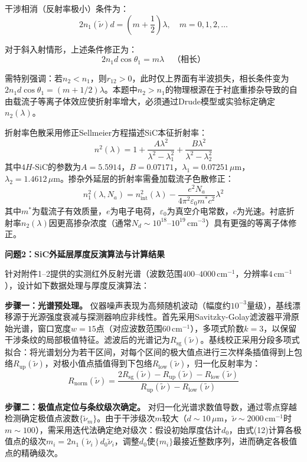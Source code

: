 \documentclass{mcmthesis}
\begin{document}
干涉相消（反射率极小）条件为：
$$2n_1(\tilde{\nu})d = \left(m+\frac{1}{2}\right)\lambda, \quad m=0,1,2,\ldots \tag{13}$$

对于斜入射情形，上述条件修正为：
$$2n_1 d\cos\theta_1 = m\lambda \quad \text{（相长）} \tag{14}$$

需特别强调：若$n_2 < n_1$，则$r_{12} > 0$，此时仅上界面有半波损失，相长条件变为$2n_1d\cos\theta_1 = (m+1/2)\lambda$。本题中$n_2 > n_1$的物理根源在于衬底重掺杂导致的自由载流子等离子体效应使折射率增大，必须通过Drude模型或实验标定确定$n_2(\lambda)$。

折射率色散采用修正Sellmeier方程描述SiC本征折射率：
$$n^2(\lambda) = 1 + \frac{A\lambda^2}{\lambda^2-\lambda_1^2} + \frac{B\lambda^2}{\lambda^2-\lambda_2^2} \tag{15}$$
其中$4H$-SiC的参数为$A=5.5914$，$B=0.07171$，$\lambda_1=0.07251\,\mu\mathrm{m}$，$\lambda_2=1.4612\,\mu\mathrm{m}$。掺杂外延层的折射率需叠加载流子色散修正：
$$n_1^2(\lambda, N_a) = n_{\mathrm{int}}^2(\lambda) - \frac{e^2N_a}{4\pi^2\varepsilon_0 m^*c^2}\lambda^2 \tag{16}$$
其中$m^*$为载流子有效质量，$e$为电子电荷，$\varepsilon_0$为真空介电常数，$c$为光速。衬底折射率$n_2(\lambda)$因更高掺杂浓度（通常$N_d \sim 10^{18}$–$10^{19}\,\mathrm{cm}^{-3}$）具有更强的等离子体修正。

\textbf{问题2：SiC外延层厚度反演算法与计算结果}

针对附件1–2提供的实测红外反射光谱（波数范围$400$–$4000\,\mathrm{cm}^{-1}$，分辨率$4\,\mathrm{cm}^{-1}$），设计如下数据处理与厚度反演算法：

\textbf{步骤一：光谱预处理。} 仪器噪声表现为高频随机波动（幅度约$10^{-3}$量级），基线漂移源于光源强度衰减与探测器响应非线性。首先采用Savitzky-Golay滤波器平滑原始光谱，窗口宽度$w=15$点（对应波数范围$60\,\mathrm{cm}^{-1}$），多项式阶数$k=3$，以保留干涉条纹的局部极值特征。滤波后的光谱记为$R_{\mathrm{sg}}(\tilde{\nu})$。基线校正采用分段多项式拟合：将光谱划分为若干区间，对每个区间的极大值点进行三次样条插值得到上包络$R_{\mathrm{up}}(\tilde{\nu})$，对极小值点插值得到下包络$R_{\mathrm{low}}(\tilde{\nu})$，归一化反射率为：
$$R_{\mathrm{norm}}(\tilde{\nu}) = \frac{2R_{\mathrm{sg}}(\tilde{\nu}) - R_{\mathrm{up}}(\tilde{\nu}) - R_{\mathrm{low}}(\tilde{\nu})}{R_{\mathrm{up}}(\tilde{\nu}) - R_{\mathrm{low}}(\tilde{\nu})} \tag{17}$$

\textbf{步骤二：极值点定位与条纹级次确定。} 对归一化光谱求数值导数，通过零点穿越检测确定极值点波数$\{\tilde{\nu}_m\}$。由于干涉级次$m$较大（$d\sim 10\,\mu\mathrm{m}$，$\tilde{\nu}\sim 2000\,\mathrm{cm}^{-1}$时$m\sim 100$），需采用迭代法确定绝对级次：假设初始厚度估计$d_0$，由式(12)计算各极值点的级次$m_i = 2n_1(\tilde{\nu}_i)d_0\tilde{\nu}_i$，调整$d_0$使$\{m_i\}$最接近整数序列，进而确定各极值点的精确级次。
\end{document}
